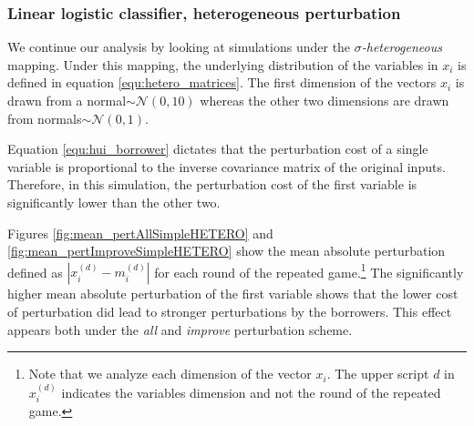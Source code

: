 \documentclass[12pt]{article} %
\begin{document}
\subsubsection{Linear logistic classifier, heterogeneous perturbation}
We continue our analysis by looking at simulations under the \textit{$\sigma$-heterogeneous} mapping. Under this mapping, the underlying distribution of the variables in $x_i$ is defined in equation \eqref{equ:hetero_matrices}. The first dimension of the vectors $x_i$ is drawn from a normal$\sim\mathcal{N}(0,10)$ whereas the other two dimensions are drawn from normals$\sim\mathcal{N}(0,1)$.

Equation \eqref{equ:hui_borrower} dictates that the perturbation cost of a single variable is proportional to the inverse covariance matrix of the original inputs. Therefore, in this simulation, the perturbation cost of the first variable is significantly lower than the other two.

Figures \ref{fig:mean_pertAllSimpleHETERO} and \ref{fig:mean_pertImproveSimpleHETERO} show the mean absolute perturbation defined as $|x_i^{(d)}- m_i^{(d)}|$ for each round of the repeated game.\footnote{Note that we analyze each dimension of the vector $x_i$. The upper script $d$ in $x_i^{(d)}$ indicates the variables dimension and not the round of the repeated game.}
The significantly higher mean absolute perturbation of the first variable shows that the lower cost of perturbation did lead to stronger perturbations by the borrowers. This effect appears both under the \textit{all} and \textit{improve} perturbation scheme. 
\end{document}
